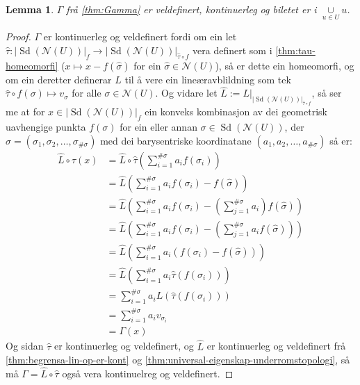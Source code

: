 \documentclass[a4paper, 12pt, norsk]{article}
\theoremstyle{plain}
\newtheorem{lemma}[theorem]{Lemma}
\theoremstyle{definition}
\newcommand{\Nc}{\mathcal{N}}
\newcommand{\union}{ \mathop{\cup}\limits }
\newcommand{\gr}[1]{ \lvert #1 \rvert } %
\newcommand{\tuple}[1]{ \left( #1 \right) } %
\DeclareMathOperator{\Sd}{Sd}
\begin{document}
\begin{lemma} \label{thm:Gamma-eigenskapar} %
	\( \Gamma \) frå \autoref{thm:Gamma} er veldefinert, kontinuerleg og biletet er i \( \union_{u\in U} u \).
\end{lemma}

\begin{proof}

	\( \Gamma \) er kontinuerleg og veldefinert fordi om ein let \( \hat{\tau} : \gr{\Sd(\Nc(U))}_f \to \gr{\Sd(\Nc(U))}_{\hat{\tau} \circ f} \) vera definert som i \autoref{thm:tau-homeomorfi} (\( x \mapsto x - f(\hat{\sigma}) \) for ein \( \hat{\sigma} \in \Nc(U) \)), så er dette ein homeomorfi, og om ein deretter definerar \( L \) til å vere ein lineæravblildning som tek \( \hat{\tau} \circ f (\sigma) \mapsto v_{\sigma} \) for alle \( \sigma \in \Nc(U) \). Og vidare let \( \hat{L} := L|_{\gr{\Sd(\Nc(U))}_{\hat{\tau}\circ f}} \), så ser me at for \( x \in \gr{\Sd(\Nc(U))}_f \) ein konveks kombinasjon av dei geometrisk uavhengige punkta \( f(\sigma) \) for ein eller annan \( \sigma \in \Sd(\Nc(U)) \), der \( \sigma = \tuple{\sigma_1, \sigma_2, \dots, \sigma_{\#\sigma}} \) med dei barysentriske koordinatane \( \tuple{a_1, a_2, \dots, a_{\#\sigma}} \) så er:
	\begin{align*}
		\hat{L} \circ \hat{\tau} (x) &= \hat{L} \circ \hat{\tau} \tuple{\sum_{i=1}^{\#\sigma}a_i f(\sigma_i)} \\
		&= \hat{L} \tuple{\sum_{i=1}^{\#\sigma}a_i f(\sigma_i)-f(\hat{\sigma})} \\
		&= \hat{L} \tuple{\sum_{i=1}^{\#\sigma}a_i f(\sigma_i)-\tuple{\sum_{j=1}^{\#\sigma}a_i}f(\hat{\sigma})} \\
		&= \hat{L} \tuple{\sum_{i=1}^{\#\sigma}a_i f(\sigma_i)-\tuple{\sum_{j=1}^{\#\sigma}a_if(\hat{\sigma})}} \\
		&= \hat{L} \tuple{\sum_{i=1}^{\#\sigma}a_i\tuple{f(\sigma_i)-f(\hat{\sigma})}} \\
		&= \hat{L} \tuple{\sum_{i=1}^{\#\sigma}a_i\hat{\tau}\tuple{f(\sigma_i)}} \\
		&= \sum_{i=1}^{\#\sigma}a_iL\tuple{\hat{\tau}\tuple{f(\sigma_i)}} \\
		&= \sum_{i=1}^{\#\sigma}a_i v_{\sigma_i} \\
		&= \Gamma(x)
	\end{align*}
	Og sidan \( \hat{\tau} \) er kontinuerleg og veldefinert, og \( \hat{L} \) er kontinuerleg og veldefinert frå \autoref{thm:begrensa-lin-op-er-kont} og \autoref{thm:universal-eigenskap-underromstopologi}, så må \( \Gamma = \hat{L}\circ\hat{\tau} \) også vera kontinuelreg og veldefinert.


\end{proof}
\end{document}
